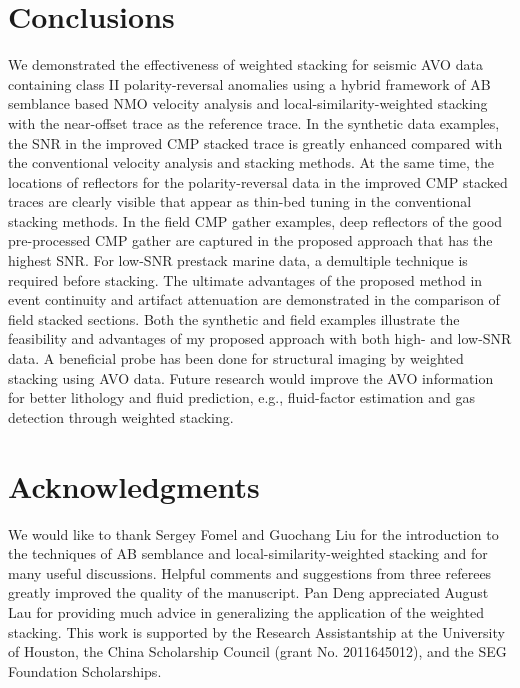\section{Conclusions}
We demonstrated the effectiveness of weighted stacking for seismic AVO data containing class II polarity-reversal anomalies using a hybrid framework of AB semblance based NMO velocity analysis and local-similarity-weighted stacking with the near-offset trace as the reference trace. In the synthetic data examples, the SNR in the improved CMP stacked trace is greatly enhanced compared with the conventional velocity analysis and stacking methods. At the same time, the locations of reflectors for the polarity-reversal data in the improved CMP stacked traces are clearly visible that appear as thin-bed tuning in the conventional stacking methods. In the field CMP gather examples, deep reflectors of the good pre-processed CMP gather are captured in the proposed approach that has the highest SNR. For low-SNR prestack marine data, a demultiple technique is required before stacking. The ultimate advantages of the proposed method in event continuity and artifact attenuation are demonstrated in the comparison of field stacked sections. Both the synthetic and field examples illustrate the feasibility and advantages of my proposed approach with both high- and low-SNR data. A beneficial probe has been done for structural imaging by weighted stacking using AVO data. Future research would improve the AVO information for better lithology and fluid prediction, e.g., fluid-factor estimation and gas detection through weighted stacking.

\section{Acknowledgments}
We would like to thank Sergey Fomel and Guochang Liu for the introduction to the
techniques of AB semblance and local-similarity-weighted stacking and for many useful discussions. Helpful comments and suggestions from three referees greatly improved the quality of the manuscript. Pan Deng appreciated August Lau for providing much advice in generalizing the application of the weighted stacking. This work is supported by the Research Assistantship at the University of Houston, the China Scholarship Council (grant No. 2011645012), and the SEG Foundation Scholarships.

